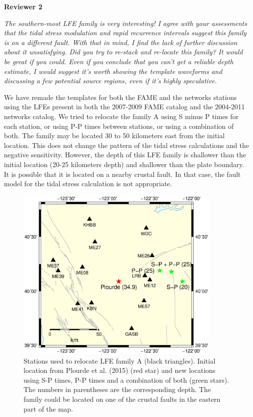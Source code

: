 \documentclass[letterpaper, 12pt]{article}
\begin{document}
\bigskip

\textbf{Reviewer 2}

\bigskip

\textit{The southern-most LFE family is very interesting! I agree with your assessments that the tidal stress modulation and rapid recurrence intervals suggest this family is on a different fault. With that in mind, I find the lack of further discussion about it unsatisfying. Did you try to re-stack and re-locate this family? It would be great if you could. Even if you conclude that you can't get a reliable depth estimate, I would suggest it's worth showing the template waveforms and discussing a few potential source regions, even if it's highly speculative.}

\bigskip

We have remade the templates for both the FAME and the networks stations using the LFEs present in both the 2007-2009 FAME catalog and the 2004-2011 networks catalog. We tried to relocate the family A using S minus P times for each station, or using P-P times between stations, or using a combination of both. The family may be located 30 to 50 kilometers east from the initial location. This does not change the pattern of the tidal stress calculations and the negative sensitivity. However, the depth of this LFE family is shallower than the initial location (20-25 kilometers depth) and shallower than the plate boundary. It is possible that it is located on a nearby crustal fault. In that case, the fault model for the tidal stress calculation is not appropriate.

\begin{figure}[hbt!]
\centering
\noindent\includegraphics[width=10cm, trim={1cm 11cm 3cm 4cm},clip]{figures/map_LFEs_answers.eps}
\caption{Stations used to relocate LFE family A (black triangles). Initial location from Plourde et al. (2015) (red star) and new locations using S-P times, P-P times and a combination of both (green stars). The numbers in parentheses are the corresponding depth. The family could be located on one of the crustal faults in the eastern part of the map.}
\end{figure}
\end{document}
